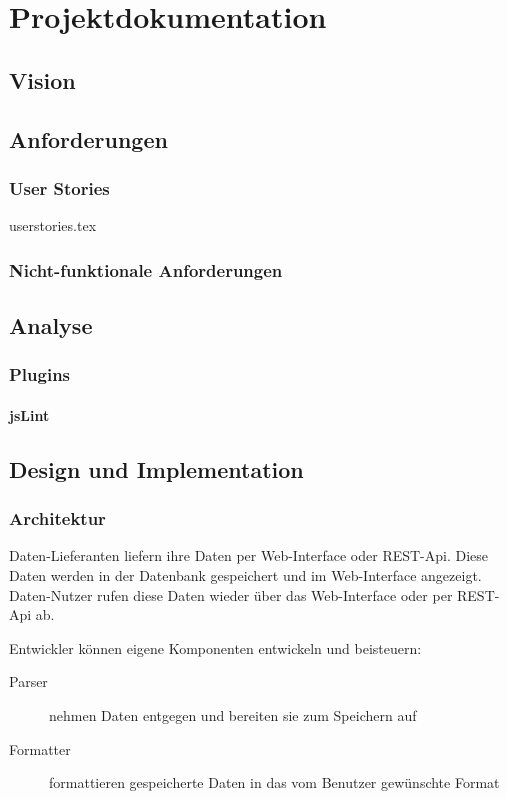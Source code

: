 \part{Projektdokumentation}

\chapter{Vision}

\chapter{Anforderungen}
\section{User Stories}
{userstories.tex}

\section{Nicht-funktionale Anforderungen}


\chapter{Analyse}
\section{Plugins}
\subsection{jsLint}

\chapter{Design und Implementation}


\section{Architektur}

Daten-Lieferanten liefern ihre Daten per Web-Interface oder REST-Api. Diese Daten werden in der Datenbank gespeichert und im Web-Interface angezeigt. Daten-Nutzer rufen diese Daten wieder über das Web-Interface oder per REST-Api ab. 

Entwickler können eigene Komponenten entwickeln und beisteuern:
\begin{description}
\item[Parser] nehmen Daten entgegen und bereiten sie zum Speichern auf
\item[Formatter] formattieren gespeicherte Daten in das vom Benutzer gewünschte Format
\end{description}

